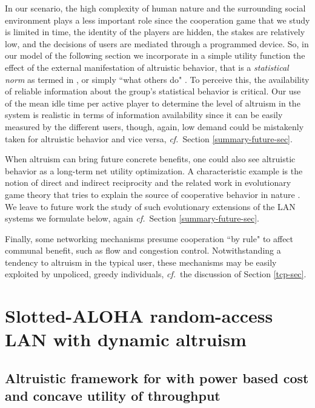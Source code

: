 \documentclass[12pt,onecolumn,draftcls]{IEEEtran}
\newcommand{\cf}{{\em cf.}~}
\begin{document}
In our scenario, the high complexity of human nature and the
surrounding social environment plays a less important role since the
cooperation game that we study is limited in time, the identity
of the players are hidden, the stakes are relatively low, and the 
decisions of users are mediated through a programmed device.
So, in our model of the following section we incorporate in a
simple utility function the effect of the external manifestation 
of altruistic behavior, that is a {\em statistical norm}
as termed in \cite{margolis07},
or simply ``what others do" \cite{bicchieri_experiments}.
To perceive this, the availability of reliable information about 
the group's statistical behavior is critical. Our use of the mean idle
time per active player
to determine the level of altruism in the system is realistic
in terms of information availability since it can be easily measured
by the different users, though, again, low demand could be 
mistakenly taken for altruistic behavior and vice 
versa, \cf Section \ref{summary-future-sec}.

When altruism can bring future concrete benefits, one could also see 
altruistic behavior as a long-term net utility optimization. 
A characteristic example is the notion of direct and indirect reciprocity 
and the related work in evolutionary game theory that tries to explain the 
source of cooperative behavior in nature \cite{Axelrod84, Nowak06}.  
We leave to future work the study of 
such evolutionary extensions of the LAN systems we formulate below,
again \cf Section \ref{summary-future-sec}.

Finally, some networking mechanisms presume cooperation ``by rule"
to affect communal benefit, such as flow and congestion control. 
Notwithstanding a tendency to altruism in the typical user, 
these mechanisms may be easily exploited by unpoliced, 
greedy individuals, \cf the discussion of Section \ref{tcp-sec}.


\section{Slotted-ALOHA random-access LAN with dynamic altruism}
\label{aloha-sec}




\subsection{Altruistic framework for with power based cost and concave
utility of throughput}
\end{document}
